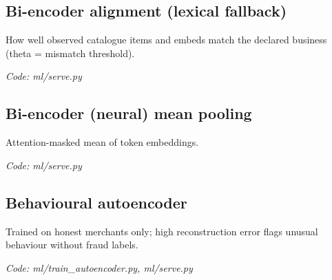 \documentclass[11pt,a4paper]{article}
\newcommand{\where}[1]{\par{\small\itshape\color{mute}Code: #1}\par}
\begin{document}
\subsection*{Bi-encoder alignment (lexical fallback)}
\par\smallskip\noindent{}\par\smallskip
\par\smallskip\noindent{}\par\smallskip
How well observed catalogue items and embeds match the declared business (theta = mismatch threshold).
\where{ml/serve.py}

\subsection*{Bi-encoder (neural) mean pooling}
\par\smallskip\noindent{}\par\smallskip
Attention-masked mean of token embeddings.
\where{ml/serve.py}

\subsection*{Behavioural autoencoder}
\par\smallskip\noindent{}\par\smallskip
\par\smallskip\noindent{}\par\smallskip
Trained on honest merchants only; high reconstruction error flags unusual behaviour without fraud labels.
\where{ml/train\_autoencoder.py, ml/serve.py}
\end{document}
